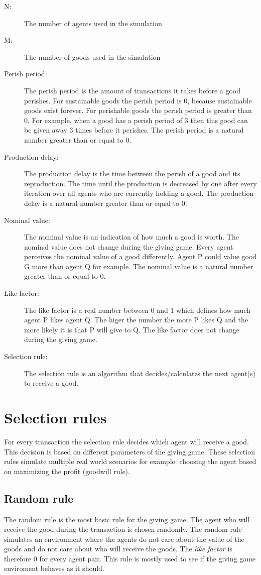 \documentclass[twoside,openright]{uva-bachelor-thesis}
\begin{document}
\begin{description}
  \item[N:] The number of agents used in the simulation
  \item[M:] The number of goods used in the simulation
  \item[Perish period:] The perish period is the amount of transactions it takes before a good perishes. For sustainable goods the perish period is 0, because sustainable goods exist forever. For perishable goods the perish period is greater than 0. For example, when a good has a perish period of 3 then this good can be given away 3 times before it perishes. The perish period is a natural number greater than or equal to 0.
  \item[Production delay:] The production delay is the time between the perish of a good and its reproduction. The time until the production is decreased by one after every iteration over all agents who are currently holding a good. The production delay is a natural number greater than or equal to 0.
  \item[Nominal value:] The nominal value is an indication of how much a good is worth. The nominal value does not change during the giving game. Every agent perceives the nominal value of a good differently. Agent P could value good G more than agent Q for example. The nominal value is a natural number greater than or equal to 0.
  \item[Like factor:] The like factor is a real number between 0 and 1 which defines how much agent P likes agent Q. The higer the number the more P likes Q and the more likely it is that P will give to Q. The like factor does not change during the giving game. 
  \item[Selection rule:] The selection rule is an algorithm that decides/calculates the next agent(s) to receive a good.

\end{description}

\section{Selection rules}
For every transaction the selection rule decides which agent will receive a good. This decision is based on different parameters of the giving game. These selection rules simulate multiple real world scenarios for example: choosing the agent based on maximizing the profit (goodwill rule).

\subsection{Random rule}
The random rule is the most basic rule for the giving game. The agent who will receive the good during the transaction is chosen randomly. The random rule simulates an environment where the agents do not care about the value of the goods and do not care about who will receive the goods. The \textit{like factor} is therefore 0 for every agent pair. This rule is mostly used to see if the giving game enviroment behaves as it should.
\end{document}
